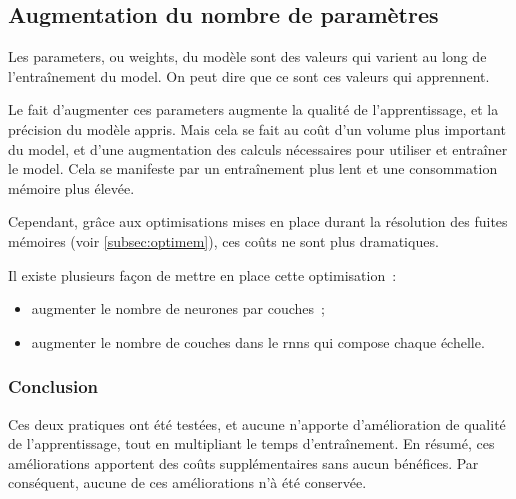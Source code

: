 \subsection{Augmentation du nombre de paramètres}\label{subsec:optiparam}
Les \glspl{parameter}, ou \glspl{weight}, du modèle sont des valeurs qui varient au long de l'entraînement du \gls{model}. On peut dire que ce sont ces valeurs qui \og apprennent\fg{}.

Le fait d'augmenter ces \glspl{parameter} augmente la qualité de l'apprentissage, et la précision du modèle appris. Mais cela se fait au coût d'un volume plus important du \gls{model}, et d'une augmentation des calculs nécessaires pour utiliser et entraîner le \gls{model}. Cela se manifeste par un entraînement plus lent et une consommation mémoire plus élevée.

Cependant, grâce aux optimisations mises en place durant la résolution des fuites mémoires (voir \autoref{subsec:optimem}), ces coûts ne sont plus dramatiques.

Il existe plusieurs façon de mettre en place cette optimisation~:
\begin{itemize}
	\item augmenter le nombre de neurones par couches~;
	\item augmenter le nombre de couches dans le \glspl{rnn} qui compose chaque \og échelle\fg{}.
\end{itemize}

\subsubsection{Conclusion}
Ces deux pratiques ont été testées, et aucune n'apporte d'amélioration de qualité de l'apprentissage, tout en multipliant le temps d'entraînement.
En résumé, ces améliorations apportent des coûts supplémentaires sans aucun bénéfices. Par conséquent, aucune de ces améliorations n'à été conservée.